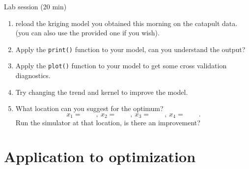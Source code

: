 \documentclass{beamer}
\begin{document}
\begin{frame}{}
\begin{exampleblock}{Lab session (20 min)}
	\begin{enumerate}
		\item reload the kriging model you obtained this morning on the catapult data. (you can also use the provided one if you wish).
    \item Apply the \texttt{print()} function to your model, can you understand the output?
		\item Apply the \texttt{plot()} function to your model to get some cross validation diagnostics.
		\item Try changing the trend and kernel to improve the model.
		\item What location can you suggest for the optimum?
		$$ x_1 = \qquad,\ x_2 = \qquad,\ x_3 = \qquad,\ x_4 = \qquad.$$
    Run the simulator at that location, is there an improvement?
	\end{enumerate}
\end{exampleblock}
\end{frame}



\section[Optimization]{Application to optimization}
\end{document}
